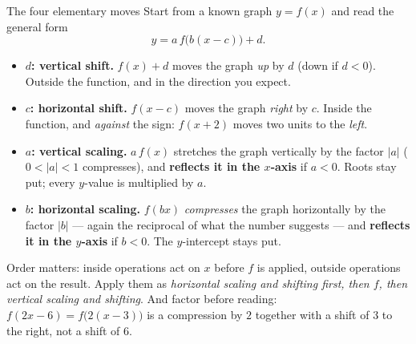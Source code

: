 \begin{rulebox}{The four elementary moves}
Start from a known graph $y=f(x)$ and read the general form
\[
  y=a\,f\bigl(b(x-c)\bigr)+d .
\]
\begin{itemize}[leftmargin=1.6em,itemsep=0.3ex]
  \item \textbf{$d$: vertical shift.} $f(x)+d$ moves the graph \emph{up}
        by $d$ (down if $d<0$). Outside the function, and in the direction
        you expect.
  \item \textbf{$c$: horizontal shift.} $f(x-c)$ moves the graph
        \emph{right} by $c$. Inside the function, and \emph{against}
        the sign: $f(x+2)$ moves two units to the \emph{left}.
  \item \textbf{$a$: vertical scaling.} $a\,f(x)$ stretches the graph
        vertically by the factor $|a|$ ($0<|a|<1$ compresses), and
        \textbf{reflects it in the $x$-axis} if $a<0$. Roots stay put;
        every $y$-value is multiplied by $a$.
  \item \textbf{$b$: horizontal scaling.} $f(bx)$ \emph{compresses} the
        graph horizontally by the factor $|b|$ --- again the reciprocal of
        what the number suggests --- and \textbf{reflects it in the
        $y$-axis} if $b<0$. The $y$-intercept stays put.
\end{itemize}
Order matters: inside operations act on $x$ before $f$ is applied, outside
operations act on the result. Apply them as
\emph{horizontal scaling and shifting first, then $f$, then vertical
scaling and shifting}. And factor before reading: $f(2x-6)=f\bigl(2(x-3)\bigr)$
is a compression by $2$ together with a shift of $3$ to the right, not a
shift of $6$.
\end{rulebox}

